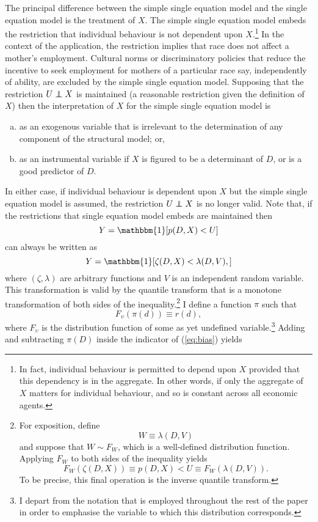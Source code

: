 \documentclass[12pt,a4paper,twoside]{article}
\newcommand\independent{\protect\mathpalette{\protect\independenT}{\perp}}
\def\independenT#1#2{\mathrel{\rlap{$#1#2$}\mkern2mu{#1#2}}}
\numberwithin{equation}{section}
\begin{document}
The principal difference between the simple single equation model and the single equation model is the treatment of $X$. The simple single equation model embeds the restriction that individual behaviour is not dependent upon $X$.\footnote{In fact, individual behaviour is permitted to depend upon $X$ provided that this dependency is in the aggregate. In other words, if only the aggregate of $X$ matters for individual behaviour, and so is constant across all economic agents.} In the context of the application, the restriction implies that race does not affect a mother's employment. Cultural norms or discriminatory policies that reduce the incentive to seek employment for mothers of a particular race say, independently of ability, are excluded by the simple single equation model. Supposing that the restriction $U\independent X$ is maintained (a reasonable restriction given the definition of $X$) then the interpretation of $X$ for the simple single equation model is 
\begin{enumerate}[(a)]
\item as an exogenous variable that is irrelevant to the determination of any component of the structural model; or,
\item as an instrumental variable if $X$ is figured to be a determinant of $D$, or is a good predictor of $D$.
\end{enumerate}   
In either case, if individual behaviour is dependent upon $X$ but the simple single equation model is assumed, the restriction $U\independent X$ is no longer valid. Note that, if the restrictions that single equation model embeds are maintained then
\[Y=\mathbbm{1}[p(D,X)<U]\]
can always be written as
\begin{equation}
Y=\mathbbm{1}[\zeta(D,X)<\lambda(D,V),]\label{eq:bias}
\end{equation}
where $(\zeta,\lambda)$ are arbitrary functions and $V$ is an independent random variable. This transformation is valid by the quantile transform that is a monotone transformation of both sides of the inequality.\footnote{For exposition, define
\[W\equiv\lambda(D,V)\]
and suppose that $W\sim F_W$, which is a well-defined distribution function. Applying $F_W$ to both sides of the inequality yields
\[F_W(\zeta(D,X))\equiv p(D,X)<U\equiv F_W(\lambda(D,V)).\]
To be precise, this final operation is the inverse quantile transform.} I define a function $\pi$ such that
\[F_{\upsilon}(\pi(d))\equiv r(d),\] 
where $F_\upsilon$ is the distribution function of some as yet undefined variable.\footnote{I depart from the notation that is employed throughout the rest of the paper in order to emphasise the variable to which this distribution corresponds.} Adding and subtracting $\pi(D)$ inside the indicator of (\ref{eq:bias}) yields
\end{document}
